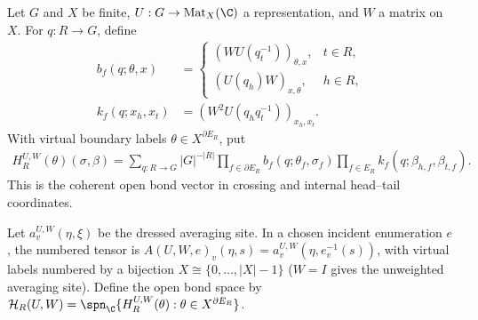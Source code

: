 \begin{definition}%
    \label{def:peps_parent_support_open_factors}
    \leanok
    Let $G$ and $X$ be finite, $U:G\to\operatorname{Mat}_X(\C)$ a
    representation, and $W$ a matrix on $X$. For $q:R\to G$, define
    \begin{align}
        b_f(q;\theta,x) & =
        \begin{cases}
            (WU(q_t^{-1}))_{\theta,x}, & t\in R, \\
            (U(q_h)W)_{x,\theta},      & h\in R,
        \end{cases}              \\
        k_f(q;x_h,x_t)  & =(W^2U(q_hq_t^{-1}))_{x_h,x_t}.
    \end{align}
    With virtual boundary labels $\theta\in X^{\partial E_R}$, put
    \begin{align}
        H_R^{U,W}(\theta)(\sigma,\beta)
        =\sum_{q:R\to G}|G|^{-|R|}
        \prod_{f\in\partial E_R}b_f(q;\theta_f,\sigma_f)
        \prod_{f\in E_R}k_f(q;\beta_{h,f},\beta_{t,f}).
        \label{eq:peps_parent_support_open_factors}
    \end{align}
    This is the coherent open bond vector in crossing and internal
    head--tail coordinates.
\end{definition}

\begin{definition}%
    \label{def:peps_parent_support_canonical_tensor}
    \leanok
    Let $a_v^{U,W}(\eta,\xi)$ be the dressed averaging site. In a
    chosen incident enumeration $e$, the numbered tensor is
    $A(U,W,e)_v(\eta,s)=a_v^{U,W}(\eta,e_v^{-1}(s))$, with virtual
    labels numbered by a bijection $X\cong\{0,\ldots,|X|-1\}$ ($W=I$ gives
    the unweighted averaging site). Define the open bond space by
    $\mathcal H_R(U,W)=\spn_{\C}\{H_R^{U,W}(\theta):\theta\in X^{\partial E_R}\}$.
\end{definition}


